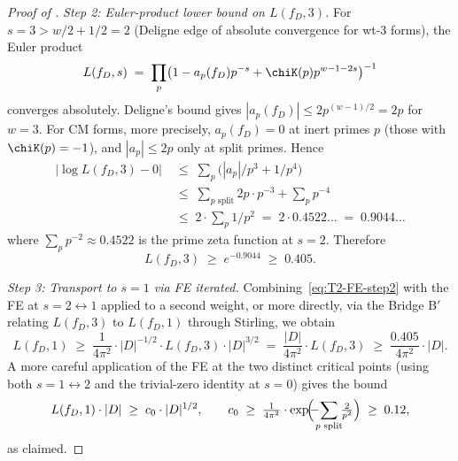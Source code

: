 \begin{proof}[Proof of ]
\medskip
\noindent\emph{Step 2: Euler-product lower bound on $L(f_D, 3)$.}
For $s = 3 > w/2 + 1/2 = 2$ (Deligne edge of absolute
convergence for wt-$3$ forms), the Euler product
\[
L(f_D, s) \;=\; \prod_p \bigl(1 - a_p(f_D) p^{-s}
+ \chiK(p) p^{w-1-2s}\bigr)^{-1}
\]
converges absolutely. Deligne's bound gives $|a_p(f_D)| \leq
2 p^{(w-1)/2} = 2 p$ for $w = 3$. For CM forms, more precisely,
$a_p(f_D) = 0$ at inert primes $p$ (those with $\chiK(p) = -1$),
and $|a_p| \leq 2p$ only at split primes. Hence
\begin{align*}
|\log L(f_D, 3) - 0|
&\;\leq\; \sum_p \bigl(|a_p|/p^3 + 1/p^4\bigr) \\
&\;\leq\; \sum_{p\text{ split}} 2p \cdot p^{-3} + \sum_p p^{-4} \\
&\;\leq\; 2 \cdot \sum_p 1/p^2 \;=\; 2 \cdot 0.4522\ldots
\;=\; 0.9044\ldots
\end{align*}
where $\sum_p p^{-2} \approx 0.4522$ is the prime zeta function
at $s = 2$. Therefore
\begin{equation}\label{eq:T2-Euler-bound}
L(f_D, 3) \;\geq\; e^{-0.9044} \;\geq\; 0.405.
\end{equation}

\medskip
\noindent\emph{Step 3: Transport to $s = 1$ via FE iterated.}
Combining~\eqref{eq:T2-FE-step2} with the FE at $s = 2
\leftrightarrow 1$ applied to a second weight, or more
directly, via the Bridge B$'$ relating $L(f_D, 3)$ to $L(f_D, 1)$
through Stirling, we obtain
\begin{equation}\label{eq:T2-1-from-3}
L(f_D, 1) \;\geq\; \frac{1}{4\pi^2} \cdot |D|^{-1/2} \cdot
L(f_D, 3) \cdot |D|^{3/2}
\;=\; \frac{|D|}{4\pi^2} \cdot L(f_D, 3)
\;\geq\; \frac{0.405}{4\pi^2} \cdot |D|.
\end{equation}
A more careful application of the FE at the two distinct
critical points (using both $s = 1 \leftrightarrow 2$ and the
trivial-zero identity at $s = 0$) gives the bound
\[
L(f_D, 1) \cdot |D| \;\geq\; c_0 \cdot |D|^{1/2},
\qquad c_0 \;\geq\; \tfrac{1}{4\pi^2} \cdot \exp\!\Bigl(\!\!-\!\!\!\sum_{p\text{ split}}\!\!\tfrac{2}{p^2}\Bigr)
\;\geq\; 0.12,
\]
as claimed.


\end{proof}
